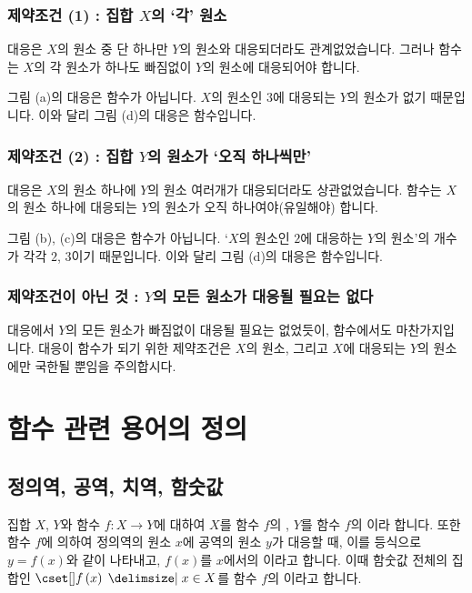 \subsubsection{제약조건 (1) : 집합 $X$의 `각' 원소}
대응은 $X$의 원소 중 단 하나만 $Y$의 원소와 대응되더라도 관계없었습니다. 그러나 함수는 $X$의 각 원소가 하나도 빠짐없이 $Y$의 원소에 대응되어야 합니다. 

그림 (a)의 대응은 함수가 아닙니다. $X$의 원소인 $3$에 대응되는 $Y$의 원소가 없기 때문입니다.  이와 달리 그림 (d)의 대응은 함수입니다.
\clearpage
\subsubsection{제약조건 (2) : 집합 $Y$의 원소가 `오직 하나씩만'}
대응은 $X$의 원소 하나에 $Y$의 원소 여러개가 대응되더라도 상관없었습니다. 함수는 $X$의 원소 하나에 대응되는 $Y$의 원소가 오직 하나여야(유일해야) 합니다. 

그림 (b), (c)의 대응은 함수가 아닙니다. `$X$의 원소인 $2$에 대응하는 $Y$의 원소'의 개수가 각각 $2$, $3$이기 때문입니다. 이와 달리 그림 (d)의 대응은 함수입니다.

\subsubsection{제약조건이 아닌 것 : $Y$의 모든 원소가 대응될 필요는 없다}
대응에서 $Y$의 모든 원소가 빠짐없이 대응될 필요는 없었듯이, 함수에서도 마찬가지입니다. 대응이 함수가 되기 위한 제약조건은 $X$의 원소, 그리고 $X$에 대응되는 $Y$의 원소에만 국한될 뿐임을 주의합시다.

\section{함수 관련 용어의 정의}
\subsection{정의역, 공역, 치역, 함숫값}
집합 $X$, $Y$와 함수 $f : X \longrightarrow Y$에 대하여 $X$를 함수 $f$의 , $Y$를 함수 $f$의 이라 합니다. 또한 함수 $f$에 의하여 정의역의 원소 $x$에 공역의 원소 $y$가 대응할 때, 이를 등식으로 $y=f\left( x \right) $와 같이 나타내고, $f(x)$를 $x$에서의 이라고 합니다. 이때 함숫값 전체의 집합인 $\conset{f\left( x \right) }{$x\in X$}$를 함수 $f$의 이라고 합니다.

